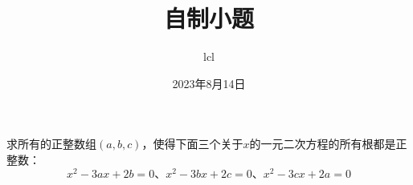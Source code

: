 \documentclass[11pt]{article}
\title{自制小题}
\date{2023年8月14日}
\author{lcl}
\begin{document}
\maketitle
求所有的正整数组$(a,b,c)$，使得下面三个关于$x$的一元二次方程的所有根都是正整数：
$$x^2-3ax+2b=0、x^2-3bx+2c=0、x^2-3cx+2a=0$$
\end{document}
